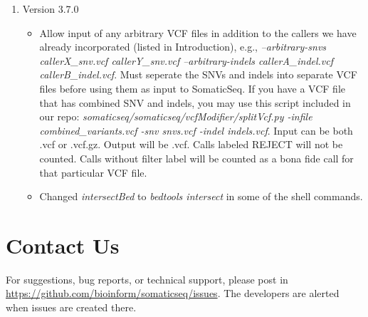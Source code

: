 \documentclass[10pt,letterpaper]{article}
\begin{document}
\begin{sloppypar}
\begin{enumerate}
\begin{itemize}
        \end{itemize}


	\item Version 3.7.0
	
        \begin{itemize}
            \item Allow input of any arbitrary VCF files in addition to the callers we have already incorporated (listed in Introduction), e.g., \textit{--arbitrary-snvs callerX\_snv.vcf callerY\_snv.vcf --arbitrary-indels callerA\_indel.vcf callerB\_indel.vcf}. Must seperate the SNVs and indels into separate VCF files before using them as input to SomaticSeq. If you have a VCF file that has combined SNV and indels, you may use this script included in our repo: \textit{somaticseq/somaticseq/vcfModifier/splitVcf.py -infile combined\_variants.vcf -snv snvs.vcf -indel indels.vcf}. Input can be both .vcf or .vcf.gz. Output will be .vcf. Calls labeled REJECT will not be counted. Calls without filter label will be counted as a bona fide call for that particular VCF file.
            
            \item Changed \textit{intersectBed} to \textit{bedtools intersect} in some of the shell commands. 
        
        \end{itemize}
\end{enumerate}




\section{Contact Us}
For suggestions, bug reports, or technical support, please post in \href{https://github.com/bioinform/somaticseq/issues}{https://github.com/bioinform/somaticseq/issues}. The developers are alerted when issues are created there. 











\end{sloppypar}
\end{document}
